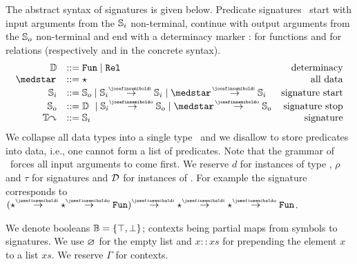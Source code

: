 The abstract syntax of signatures is given below. %
Predicate signatures \TYPE\ start with input arguments from the $\mathbb{S}_i$ non-terminal,
continue with output arguments from the $\mathbb{S}_o$ non-terminal and end
with a determinacy marker \F: \detI for functions and \relI for relations (respectively 
and  in the concrete syntax). %
  $$
  \begin{array}{rlr}
    \F & ::= \detI \mid \relI & \mathrm{~~determinacy} \\
    \STAR & ::= \star & \mathrm{all\ data} \\
    \SIGN_i & ::= \SIGN_o \mid \SIGN_i \toI \SIGN_i \mid \STAR \toI \SIGN_i & \mathrm{signature\ start} \\
    \SIGN_o & ::=     \F\ \mid \SIGN_i \toO \SIGN_o \mid \STAR \toO \SIGN_o & \mathrm{signature\ stop} \\
    \TYPE   & ::= \SIGN_i& \mathrm{signature} 
  \end{array}
  $$
We collapse
all data types into a single type \STAR\ and
we disallow to store predicates into data, i.e., one cannot form a list of
predicates.
Note that the grammar of \TYPE\ forces all input arguments to come first.
We  reserve $d$ for instances of type \STAR, $\rho$ and $\tau$ for signatures and $\mathcal{D}$ for instances of \F.
For example the signature
corresponds to
$(\star \toI \star \toO \detI) \toI \star \toI \star \toO \detI$.

We denote booleans $\mathbb{B} = \{ \top, \bot\}$;
contexts \CTX being partial
maps from symbols to signatures. 
We use $\varnothing$ for the empty list and $x :: xs$ for prepending the element $x$
to a list $xs$. 
We reserve 
$\Gamma$ for
contexts.

